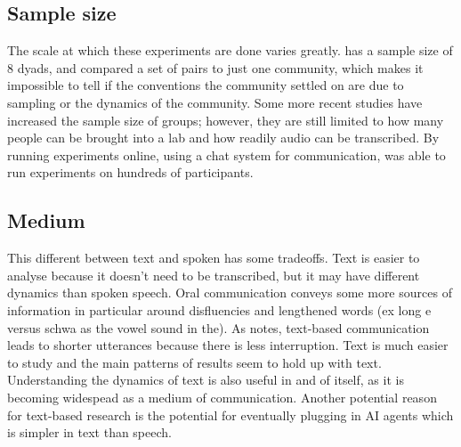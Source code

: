 \documentclass[11pt]{article}
\begin{document}
	\subsection{Sample size}
	The scale at which these experiments are done varies greatly. \cite{clarkReferringCollaborativeProcess1986} has a sample size of 8 dyads, and \cite{garrodConversationCoordinationConvention1994} compared a set of pairs to just one community, which makes it impossible to tell if the conventions the community settled on are due to sampling or the dynamics of the community. Some more recent studies have increased the sample size of groups; however, they are still limited to how many people can be brought into a lab and how readily audio can be transcribed. By running experiments online, using a chat system for communication, \cite{hawkinsCharacterizingDynamicsLearning2020} was able to run experiments on hundreds of participants.
	
	\subsection{Medium}
	This different between text and spoken has some tradeoffs. Text is easier to analyse because it doesn't need to be transcribed, but it may have different dynamics than spoken speech.  Oral communication conveys some more sources of information in particular around disfluencies and lengthened words (ex long e versus schwa as the vowel sound in the). As \cite{hawkinsCharacterizingDynamicsLearning2020} notes, text-based communication leads to shorter utterances because there is less interruption. 
	Text is much easier to study and the main patterns of results seem to hold up with text. Understanding the dynamics of text is also useful in and of itself, as it is becoming widespead as a medium of communication. Another potential reason for text-based research is the potential for eventually plugging in AI agents which is simpler in text than speech.
	
\end{document}

